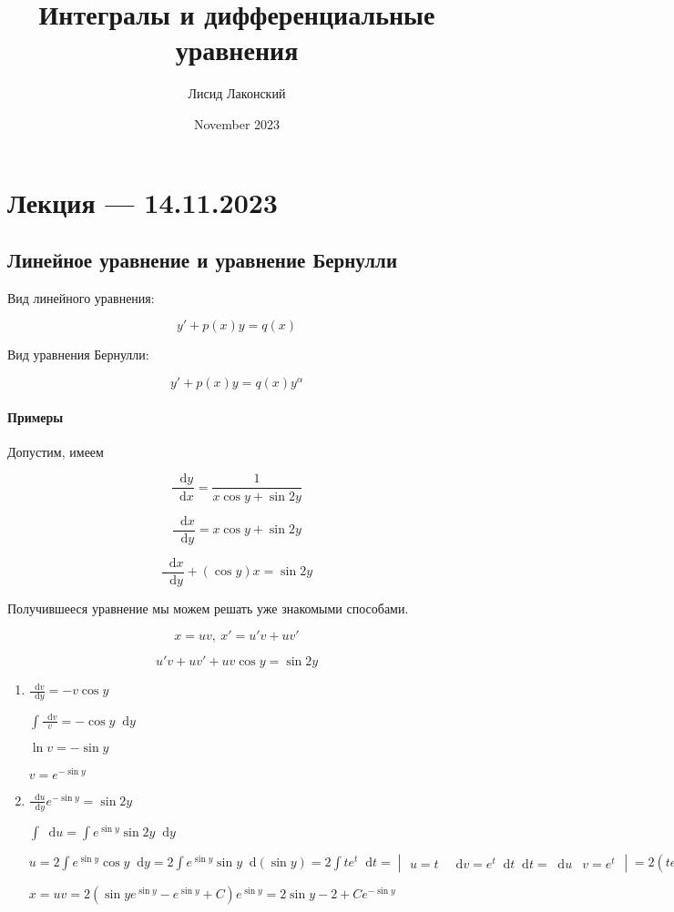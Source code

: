 \documentclass{article}
\title{Интегралы и дифференциальные уравнения}
\author{Лисид Лаконский}
\date{November 2023}
\newcommand*\diff{\mathop{}\!\mathrm{d}}
\begin{document}
\raggedright

\maketitle

\tableofcontents
\pagebreak

\section{Лекция — 14.11.2023}

\subsection{Линейное уравнение и уравнение Бернулли}

Вид линейного уравнения:

$$y' + p(x) y = q(x)$$

Вид уравнения Бернулли:

$$y' + p(x) y = q(x) y^{\alpha}$$

\paragraph{Примеры}

Допустим, имеем

$$\frac{\diff y}{\diff x} = \frac{1}{x \cos y + \sin 2 y}$$

$$\frac{\diff x}{\diff y} = x \cos y + \sin 2 y$$

$$\frac{\diff x}{\diff y} + (\cos y) x = \sin 2y$$

Получившееся уравнение мы можем решать уже знакомыми способами.

$$x = u v, \ x' = u' v + u v'$$

$$u'v + uv' + u v \cos y = \sin 2y$$

\begin{enumerate}
    \item 

    $\frac{\diff v}{\diff y} = -v \cos y$

    $\int \frac{\diff v}{v} = -\cos y \diff y$

    $\ln v = - \sin y$

    $v = e^{-\sin y}$

    \item
    
    $\frac{\diff u}{\diff y} e^{- \sin y} = \sin 2y$

    $\int \diff u = \int e^{\sin y} \sin 2y \diff y$

    $u = 2 \int e^{\sin y} \cos y \diff y = 2 \int e^{\sin y} \sin y \diff (\sin y) = 2 \int t e^{t} \diff t = \begin{vmatrix}
        u = t & \diff v = e^{t} \diff t
        \diff t = \diff u & v = e^{t}
    \end{vmatrix} = 2 (te^{t} - e^{t}) + C$

    $x = uv = 2 (\sin y e^{\sin y} - e^{\sin y} + C) e^{\sin y} = 2 \sin y - 2 + C e^{- \sin y}$
\end{enumerate}
\end{document}
